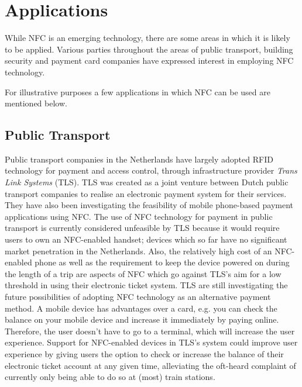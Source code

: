 \section{Applications}
While NFC is an emerging technology, there are some areas in which it is likely to be applied.
Various parties throughout the areas of public transport, building security and payment card companies have expressed interest in employing NFC technology.

For illustrative purposes a few applications in which NFC can be used are mentioned below.

\subsection{Public Transport}
Public transport companies in the Netherlands have largely adopted RFID technology for payment and access control, through infrastructure provider \textit{Trans Link Systems} (TLS).
TLS was created as a joint venture between Dutch public transport companies to realise an electronic payment system for their services. They have also been investigating the feasibility of mobile phone-based payment applications using NFC.
The use of NFC technology for payment in public transport is currently considered unfeasible by TLS because it would require users to own an NFC-enabled handset; devices which so far have no significant market penetration in the Netherlands.
Also, the relatively high cost of an NFC-enabled phone as well as the requirement to keep the device powered on during the length of a trip are aspects of NFC which go against TLS's aim for a low threshold in using their electronic ticket system.
TLS are still investigating the future possibilities of adopting NFC technology as an alternative payment method. \cite{OVchipkaart} %
A mobile device has advantages over a card, e.g. you can check the balance on your mobile device and increase it immediately by paying online. Therefore, the user doesn't have to go to a terminal, which will increase the user experience.
Support for NFC-enabled devices in TLS's system could improve user experience by giving users the option to check or increase the balance of their electronic ticket account at any given time, alleviating the oft-heard complaint of currently only being able to do so at (most) train stations.


